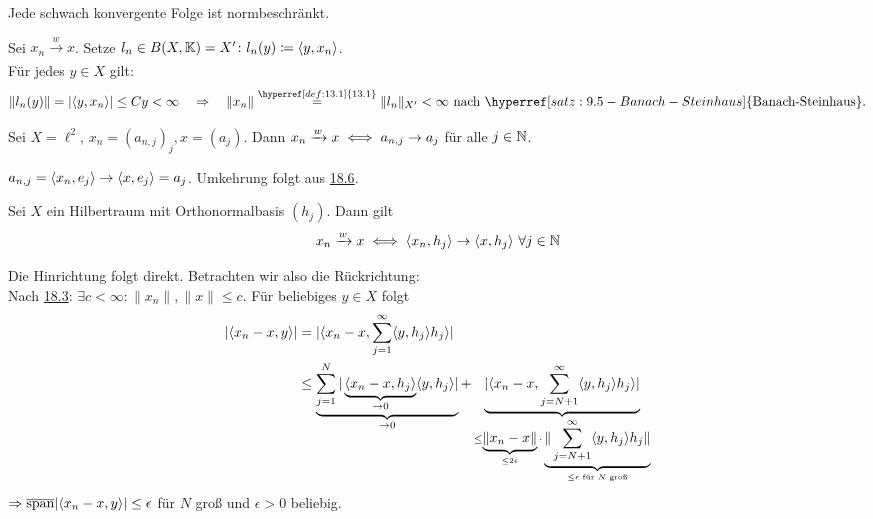 \begin{prop}
	Jede schwach konvergente Folge ist normbeschränkt.
\end{prop}

\begin{beweis}
	Sei $x_{n} \xrightarrow[]{w} x$. Setze $l_{n} \in B(X, \mathbb{K}) = X' \colon l_{n}(y) \coloneqq \langle y, x_{n} \rangle	$. \\
	Für jedes $y \in X$ gilt: 
	\[ \| l_{n}(y) \| = | \< y , x_{n} \> | \leq C y < \infty \quad \Rightarrow \quad \| x_{n} \| \overset{\hyperref[def:13.1]{13.1}}{=} \| l_{n} \|_{X'} < \infty \text{ nach } \hyperref[satz:9.5-Banach-Steinhaus]{\text{Banach-Steinhaus}}. \]
\end{beweis}


\begin{beispiel}
	Sei $X = \ell^{2}$, $x_{n} = (a_{n, j})_{j}, x = (a_{j})$. Dann $x_{n} \xrightarrow[]{w} x \iff a_{n, j} \rightarrow a_{j}$ für alle $j \in \mathbb{N}$.
\end{beispiel}

\begin{beweis}
	$a_{n, j} = \langle x_{n} , e_{j} \rangle \rightarrow \langle x , e_{j} \rangle = a_{j}$. Umkehrung folgt aus \hyperref[prop:18.6]{18.6}.	
\end{beweis}


\begin{prop} \label{prop:18.6}
	Sei $X$ ein Hilbertraum mit Orthonormalbasis $(h_{j})$. Dann gilt
	\[ x_{n} \xrightarrow[]{w} x \iff \langle x_{n} , h_{j} \rangle \rightarrow \langle x , h_{j} \rangle ~ \forall j \in \mathbb{N} \]
\end{prop}

\begin{beweis}
	Die Hinrichtung folgt direkt. Betrachten wir also die Rückrichtung: \\	
	Nach \hyperref[prop:18.3]{18.3}: $\exists c < \infty \colon \| x_{n} \|, \| x \| \leq c$. Für beliebiges $y \in X$ folgt
	\begin{align*}
		| \langle x_{n} - x , y \rangle | & = | \langle x_{n} - x , \sum_{j = 1}^{\infty} \langle y , h_{j} \rangle h_{j} \rangle | \\
			& \leq \underbrace{\sum_{j = 1}^{N} |\underbrace{\langle x_{n} - x , h_{j} \rangle}_{\rightarrow 0} \langle y  , h_{j} \rangle|}_{\rightarrow 0} + \underbrace{|\langle x_{n} - x ,\sum_{j = N + 1}^{\infty} \langle y , h_{j} \rangle h_{j} \rangle|}_{ \leq \underbrace{\| x_{n} - x \|}_{\leq 2 \epsilon} \cdot \underbrace{\| \sum_{j = N + 1}^{\infty} \langle y , h_{j} \rangle h_{j} \|}_{\leq \epsilon \text{ für } N \text{ gro{\ss}}}}
	\end{align*}
	$\Rightarrow \overline{\operatorname{span}} | \langle x_{n} - x , y \rangle | \leq \epsilon$ für $N$ gro{\ss} und $\epsilon > 0$ beliebig.
\end{beweis}


